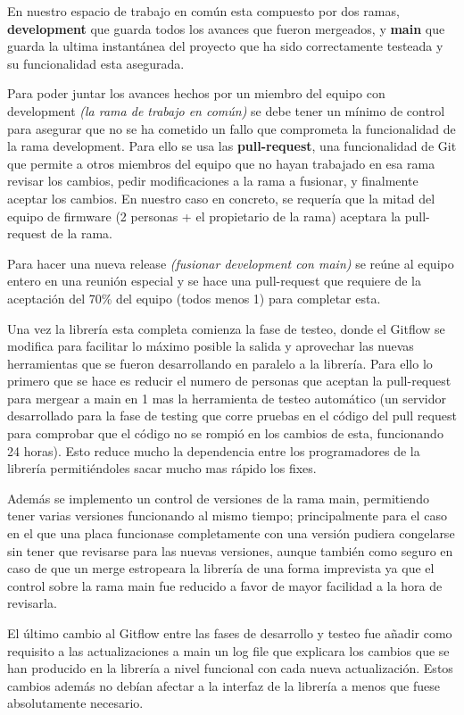 \documentclass{report}
\begin{document}
En nuestro espacio de trabajo en común esta compuesto por dos ramas, \textbf{development} que guarda todos los avances que fueron mergeados, y \textbf{main} que guarda la ultima instantánea del proyecto que ha sido correctamente testeada y su funcionalidad esta asegurada. \par
Para poder juntar los avances hechos por un miembro del equipo con development \textit{(la rama de trabajo en común)} se debe tener un mínimo de control para asegurar que no se ha cometido un fallo que comprometa la funcionalidad de la rama development. Para ello se usa las \textbf{pull-request}, una funcionalidad de Git que permite a otros miembros del equipo que no hayan trabajado en esa rama revisar los cambios, pedir modificaciones a la rama a fusionar, y finalmente aceptar los cambios. En nuestro caso en concreto, se requería que la mitad del equipo de firmware (2 personas + el propietario de la rama) aceptara la pull-request de la rama. \par
Para hacer una nueva release \textit{(fusionar development con main)} se reúne al equipo entero en una reunión especial y se hace una pull-request que requiere de la aceptación del 70\% del equipo (todos menos 1) para completar esta. 
\par \vspace{0.3 cm}

Una vez la librería esta completa comienza la fase de testeo, donde el Gitflow se modifica para facilitar lo máximo posible la salida y aprovechar las nuevas herramientas que se fueron desarrollando en paralelo a la librería. Para ello lo primero que se hace es reducir el numero de personas que aceptan la pull-request para mergear a main en 1 mas la herramienta de testeo automático (un servidor desarrollado para la fase de testing que corre pruebas en el código del pull request para comprobar que el código no se rompió en los cambios de esta, funcionando 24 horas). Esto reduce mucho la dependencia entre los programadores de la librería permitiéndoles sacar mucho mas rápido los fixes. \par
Además se implemento un control de versiones de la rama main, permitiendo tener varias versiones funcionando al mismo tiempo; principalmente para el caso en el que una placa funcionase completamente con una versión pudiera congelarse sin tener que revisarse para las nuevas versiones, aunque también como seguro en caso de que un merge estropeara la librería de una forma imprevista ya que el control sobre la rama main fue reducido a favor de mayor facilidad a la hora de revisarla. \par
El último cambio al Gitflow entre las fases de desarrollo y testeo fue añadir como requisito a las actualizaciones a main un log file que explicara los cambios que se han producido en la librería a nivel funcional con cada nueva actualización. Estos cambios además no debían afectar a la interfaz de la librería a menos que fuese absolutamente necesario. 
\par \vspace{0.3 cm}
\end{document}
